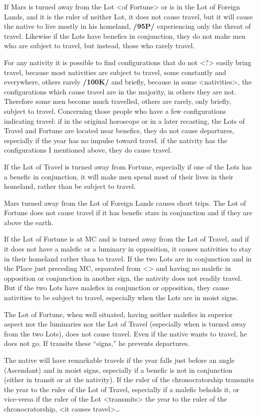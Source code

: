 If Mars is turned away from the Lot <of Fortune> or is in the Lot of Foreign Lands, and it is the ruler of neither Lot, it does not cause travel, but it will cause the native to live mostly in his homeland, \textbf{/95P/} experiencing
only the threat of travel. Likewise if the Lots have benefics in conjunction, they do not make men who are subject to travel, but instead, those who rarely travel.

For any nativity it is possible to find configurations that do not <?> easily bring travel, because most nativities are subject to travel, some constantly and everywhere, others rarely \textbf{/100K/} and briefly, because in some <nativities>, the configurations which cause travel are in the majority, in others they are not. Therefore some men become much travelled, others are rarely, only briefly, subject to travel. Concerning those people who have a few configurations indicating travel: if in the original horoscope or in a later
recasting, the Lots of Travel and Fortune are located near benefics, they do not cause departures, especially if the year has no impulse toward travel. if the nativity has the configurations I mentioned above, they do cause travel. 

If the Lot of Travel is turned away from Fortune, especially if one of the Lots has a benefic in conjunction, it will make men spend most of their lives in their homeland, rather than be subject to travel.

Mars turned away from the Lot of Foreign Lands causes short trips. The Lot of Fortune does not cause travel if it has benefic stars in conjunction and if they are above the earth.

If the Lot of Fortune is at MC and is turned away from the Lot of Travel, and if it does not have a malefic or a luminary in opposition, it causes nativities to stay in their homeland rather than to travel. If the two Lots are in conjunction and in the Place just preceding MC, separated from <\Mars> and having no malefic in opposition or conjunction in another sign, the nativity does not readily travel. But if the two Lots have malefics in conjunction or opposition, they cause nativities to be subject to travel, especially when the Lots are in moist signs. 

The Lot of Fortune, when well situated, having neither malefics in superior aspect nor the luminaries nor the Lot of Travel (especially when \Mars\xspace is turned away from the two Lots), does not cause travel. Even if the native wants to travel, he does not go. If \Jupiter\xspace transits these “signs,” he prevents departures. 

The native will have remarkable travels if the year falls just before an angle (Ascendant) and in moist signs, especially
if a benefic is not in conjunction (either in transit or at the nativity). If the ruler of the chronocratorship transmits the year to the ruler of the Lot of Travel, especially if a malefic beholds it, or vice-versa if the ruler of the Lot <transmits> the year to the ruler of the chronocratorship, <it causes travel>\ldots


\newpage